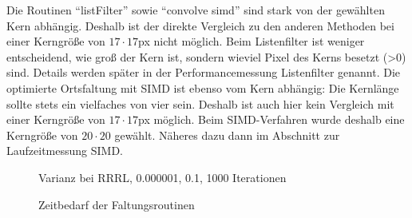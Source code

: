 \documentclass[a4paper,12pt]{article}
\begin{document}
Die Routinen "`listFilter"' sowie "`convolve simd"' sind stark von der gewählten
Kern abhängig. Deshalb ist der direkte Vergleich zu den anderen Methoden
bei einer Kerngröße von $17 \cdot 17$px nicht möglich. Beim Listenfilter ist
weniger entscheidend, wie groß der Kern ist, sondern wieviel Pixel des Kerns
besetzt (>0) sind. Details werden später in der Performancemessung Listenfilter
genannt. Die optimierte Ortsfaltung mit SIMD ist ebenso vom Kern abhängig: Die
Kernlänge sollte stets ein vielfaches von vier sein. Deshalb ist auch hier kein
Vergleich mit einer Kerngröße von $17 \cdot 17$px möglich. Beim SIMD-Verfahren
wurde deshalb eine Kerngröße von $20 \cdot 20$ gewählt. Näheres dazu dann im
Abschnitt zur Laufzeitmessung SIMD.
\begin{figure}[htbp]
\caption{Varianz bei RRRL, 0.000001, 0.1, 1000 Iterationen}%
\label{figure_konver_altes_bild}
\end{figure}
\begin{figure}[htbp]
\caption{Zeitbedarf der Faltungsroutinen}%
\label{figure_zeit_faltung}
\end{figure}  
\end{document}
